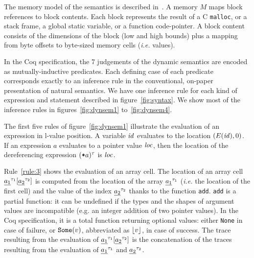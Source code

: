 \documentclass[namedreferences]{kluwer}
\begin{document}
\begin{article}
The memory model of the semantics is described in~\cite{icfem:sb}.
A memory $M$ maps block references to block contents.
Each block represents the result of a C \texttt{malloc},
or a stack frame, a global static variable, or a function
code-pointer. 
A block content consists of the dimensions of the block (low and high bounds) 
plus a mapping from byte offsets to byte-sized memory cells (\textit{i.e.} 
values).


In the Coq specification, the 7 judgements of the dynamic semantics
are encoded as mutually-inductive predicates. Each defining case of
each predicate corresponds exactly to an inference rule in the
conventional, on-paper presentation of natural semantics.  We have one
inference rule for each kind of expression and statement described in
figure~\ref{fig:syntax}. 
 We show most of the inference rules in figures~\ref{fig:dynsem1} 
to~\ref{fig:dynsem4}.  



The first five rules of figure~\ref{fig:dynsem1} illustrate the 
evaluation of an expression in l-value position.
A variable $\mathit{id}$ evaluates to the location $(E(\mathit{id}), 0)$.
If an expression $a$ evaluates to a pointer value ${\it loc}$, then
the location of the dereferencing expression $(\hbox{{\tt *}}a)^\tau$ is ${\it loc}$.

Rule~\ref{rule:3} shows the evaluation of an array cell.
The location of an array cell ${\underline{a_1}}^{\tau_1} [{\underline{a_2}}^{\tau_2}]$
is computed from the location of the array ${\underline{a_1}}^{\tau_1}$
({\it i.e.} the location of the first cell) and the value of the index
${\underline{a_2}}^{\tau_2}$ thanks to the function {\tt add}. 
{\tt add} is a partial function:
it can be undefined if the types and the shapes of argument values are
incompatible (e.g. an integer addition of two pointer values).
In the Coq specification, it is a total 
function returning optional values: either {\tt None} in case of failure, or 
${\tt Some}(v)$, abbreviated as $\lfloor v \rfloor$, in case of success.
The trace resulting from the evaluation of 
${\underline{a_1}}^{\tau_1} [{\underline{a_2}}^{\tau_2}]$ is the concatenation of the 
traces resulting from the evaluation of ${\underline{a_1}}^{\tau_1}$ and 
${\underline{a_2}}^{\tau_2}$.



\end{article}
\end{document}
